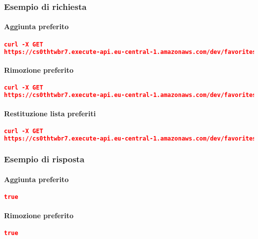 \subsubsection{Esempio di richiesta}
\paragraph{Aggiunta preferito}
\begin{lstlisting}[language=json]
curl -X GET 
https://cs0thtwbr7.execute-api.eu-central-1.amazonaws.com/dev/favorites?action=add&user=515d659b-baec-413b-9b37-703498372093&restaurant=100
\end{lstlisting}

\paragraph{Rimozione preferito}
\begin{lstlisting}[language=json]
curl -X GET 
https://cs0thtwbr7.execute-api.eu-central-1.amazonaws.com/dev/favorites?action=remove&user=515d659b-baec-413b-9b37-703498372093&restaurant=100
\end{lstlisting}



\paragraph{Restituzione lista preferiti}
\begin{lstlisting}[language=json]
curl -X GET 
https://cs0thtwbr7.execute-api.eu-central-1.amazonaws.com/dev/favorites?action=get&user=515d659b-baec-413b-9b37-703498372093
\end{lstlisting}

\pagebreak

\subsubsection{Esempio di risposta}
\paragraph{Aggiunta preferito}
\begin{lstlisting}[language=json]
true
\end{lstlisting}

\paragraph{Rimozione preferito}
\begin{lstlisting}[language=json]
true
\end{lstlisting}



